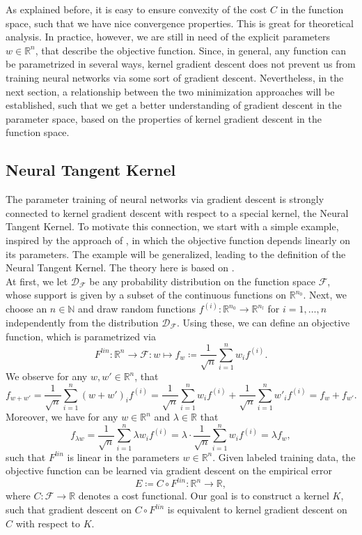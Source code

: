\documentclass[11pt, a4paper]{article}
\newcommand{\N}{\mathbb{N}}
\newcommand{\R}{\mathbb{R}}
\newcommand{\D}{\mathcal{D}}
\newcommand{\F}{\mathcal{F}}
\begin{document}
As explained before, it is easy to ensure convexity of the cost $C$ in the function space, such that we have nice convergence properties. This is great for theoretical analysis. In practice, however, we are still in need of the explicit parameters $w \in \R^n$, that describe the objective function. Since, in general, any function can be parametrized in several ways, kernel gradient descent does not prevent us from training neural networks via some sort of gradient descent. Nevertheless, in the next section, a relationship between the two minimization approaches will be established, such that we get a better understanding of gradient descent in the parameter space, based on the properties of kernel gradient descent in the function space.

\subsection{Neural Tangent Kernel}

The parameter training of neural networks via gradient descent is strongly connected to kernel gradient descent with respect to a special kernel, the Neural Tangent Kernel. To motivate this connection, we start with a simple example, inspired by the approach of \cite{Features}, in which the objective function depends linearly on its parameters. The example will be generalized, leading to the definition of the Neural Tangent Kernel. The theory here is based on \cite{NTK}. \\

At first, we let $\D_{\F}$ be any probability distribution on the function space $\F$, whose support is given by a subset of the continuous functions on $\R^{n_0}$. Next, we choose an $n \in \N$ and draw random functions $f^{(i)} : \R^{n_0} \to \R^{n_l}$ for $i=1,\dots,n$ independently from the distribution $\D_{\F}$. Using these, we can define an objective function, which is parametrized via
\[ F^\textit{lin}: \R^n \to \F : w \mapsto f_w \coloneq \frac{1}{\sqrt{n}} \sum_{i=1}^{n}w_if^{(i)}. \]
We observe for any $w, w' \in \R^n$, that
\[ f_{w + w'} = \frac{1}{\sqrt{n}} \sum_{i=1}^{n}(w+ w')_if^{(i)} = \frac{1}{\sqrt{n}} \sum_{i=1}^{n}w_if^{(i)} + \frac{1}{\sqrt{n}} \sum_{i=1}^{n}w'_if^{(i)} = f_w + f_{w'}. \]
Moreover, we have for any $w \in \R^n$ and $\lambda \in \R$ that 
\[ f_{\lambda w} = \frac{1}{\sqrt{n}} \sum_{i=1}^{n}\lambda w_if^{(i)} = \lambda \cdot \frac{1}{\sqrt{n}} \sum_{i=1}^{n} w_if^{(i)} = \lambda f_w, \]
such that $F^\textit{lin}$ is linear in the parameters $w \in \R^n$. Given labeled training data, the objective function can be learned via gradient descent on the empirical error
\[ E \coloneq C \circ F^\textit{lin}: \R^n \to \R, \]
where $C: \F \to \R$ denotes a cost functional. Our goal is to construct a kernel $K$, such that gradient descent on $C \circ F^\textit{lin}$ is equivalent to kernel gradient descent on $C$ with respect to $K$. \\
\end{document}

